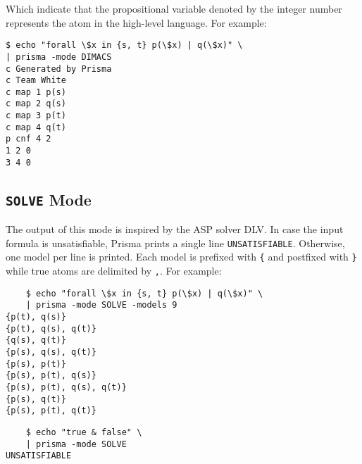 \documentclass{llncs}
\begin{document}
Which indicate that the propositional variable denoted by the integer number represents the atom in the high-level language. For example:

\begin{verbatim}
$ echo "forall \$x in {s, t} p(\$x) | q(\$x)" \
| prisma -mode DIMACS
c Generated by Prisma
c Team White
c map 1 p(s)
c map 2 q(s)
c map 3 p(t)
c map 4 q(t)
p cnf 4 2
1 2 0
3 4 0

\end{verbatim}

\subsection{\texttt{SOLVE} Mode}

The output of this mode is inspired by the ASP solver DLV. In case the input formula is unsatisfiable, Prisma prints a single line \texttt{UNSATISFIABLE}. Otherwise, one model per line is printed. Each model is prefixed with \texttt{\{} and postfixed with \texttt{\}} while true atoms are delimited by \texttt{,}. For example:

\begin{verbatim}
	$ echo "forall \$x in {s, t} p(\$x) | q(\$x)" \
	| prisma -mode SOLVE -models 9
{p(t), q(s)}
{p(t), q(s), q(t)}
{q(s), q(t)}
{p(s), q(s), q(t)}
{p(s), p(t)}
{p(s), p(t), q(s)}
{p(s), p(t), q(s), q(t)}
{p(s), q(t)}
{p(s), p(t), q(t)}
\end{verbatim}

\begin{verbatim}
	$ echo "true & false" \
	| prisma -mode SOLVE
UNSATISFIABLE
\end{verbatim}
\end{document}
